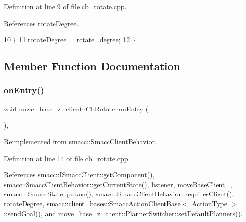 Definition at line 9 of file cb\+\_\+rotate.\+cpp.



References rotate\+Degree.


\begin{DoxyCode}
10 \{
11     \hyperlink{classmove__base__z__client_1_1CbRotate_a30d0f24b857149d78a023635562516b6}{rotateDegree} = rotate\_degree;
12 \}
\end{DoxyCode}


\subsection{Member Function Documentation}
\mbox{\label{classmove__base__z__client_1_1CbRotate_a1528192ce89f2c1cbd9deffafecefb69}} 
\subsubsection{\texorpdfstring{on\+Entry()}{onEntry()}}
{\footnotesize\ttfamily void move\+\_\+base\+\_\+z\+\_\+client\+::\+Cb\+Rotate\+::on\+Entry (\begin{DoxyParamCaption}{ }\end{DoxyParamCaption})\hspace{0.3cm}{\ttfamily [override]}, {\ttfamily [virtual]}}



Reimplemented from \hyperlink{classsmacc_1_1SmaccClientBehavior_a7962382f93987c720ad432fef55b123f}{smacc\+::\+Smacc\+Client\+Behavior}.



Definition at line 14 of file cb\+\_\+rotate.\+cpp.



References smacc\+::\+I\+Smacc\+Client\+::get\+Component(), smacc\+::\+Smacc\+Client\+Behavior\+::get\+Current\+State(), listener, move\+Base\+Client\+\_\+, smacc\+::\+I\+Smacc\+State\+::param(), smacc\+::\+Smacc\+Client\+Behavior\+::requires\+Client(), rotate\+Degree, smacc\+::client\+\_\+bases\+::\+Smacc\+Action\+Client\+Base$<$ Action\+Type $>$\+::send\+Goal(), and move\+\_\+base\+\_\+z\+\_\+client\+::\+Planner\+Switcher\+::set\+Default\+Planners().


